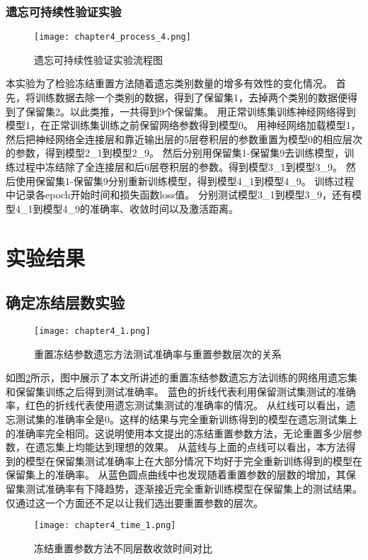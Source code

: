 \subsubsection{遗忘可持续性验证实验}
\begin{figure}
    \centering
    \texttt{[image: chapter4\_process\_4.png]}
    \caption{遗忘可持续性验证实验流程图}
    \label{fig:chapter4_process_4}
\end{figure}

本实验为了检验冻结重置方法随着遗忘类别数量的增多有效性的变化情况。
首先，将训练数据去除一个类别的数据，得到了保留集1，去掉两个类别的数据便得到了保留集2。以此类推，一共得到9个保留集。
用正常训练集训练神经网络得到模型1，在正常训练集训练之前保留网络参数得到模型0。
用神经网络加载模型1，然后把神经网络全连接层和靠近输出层的5层卷积层的参数重置为模型0的相应层次的参数，得到模型2\_1到模型2\_9。
然后分别用保留集1-保留集9去训练模型，训练过程中冻结除了全连接层和后6层卷积层的参数。得到模型3\_1到模型3\_9。
然后使用保留集1-保留集9分别重新训练模型，得到模型4\_1到模型4\_9。
训练过程中记录各epoch开始时间和损失函数loss值。
分别测试模型3\_1到模型3\_9，还有模型4\_1到模型4\_9的准确率、收敛时间以及激活距离。

\section{实验结果}
\subsection{确定冻结层数实验}
\begin{figure}
    \centering
    \texttt{[image: chapter4\_1.png]}
    \caption{重置冻结参数遗忘方法测试准确率与重置参数层次的关系}
    \label{fig:chapter4_1}
\end{figure}

如图\ref{fig:chapter4_1}所示，图中展示了本文所讲述的重置冻结参数遗忘方法训练的网络用遗忘集和保留集训练之后得到测试准确率。
蓝色的折线代表利用保留测试集测试的准确率，红色的折线代表使用遗忘测试集测试的准确率的情况。
从红线可以看出，遗忘测试集的准确率全是0。这样的结果与完全重新训练得到的模型在遗忘测试集上的准确率完全相同。这说明使用本文提出的冻结重置参数方法，无论重置多少层参数，在遗忘集上均能达到理想的效果。
从蓝线与上面的点线可以看出，本方法得到的模型在保留集测试准确率上在大部分情况下均好于完全重新训练得到的模型在保留集上的准确率。
从蓝色圆点曲线中也发现随着重置参数的层数的增加，其保留集测试准确率有下降趋势，逐渐接近完全重新训练模型在保留集上的测试结果。
仅通过这一个方面还不足以让我们选出要重置参数的层次。
\begin{figure}
    \centering
    \texttt{[image: chapter4\_time\_1.png]}
    \caption{冻结重置参数方法不同层数收敛时间对比}
    \label{fig:chapter4_time_1}
\end{figure}

